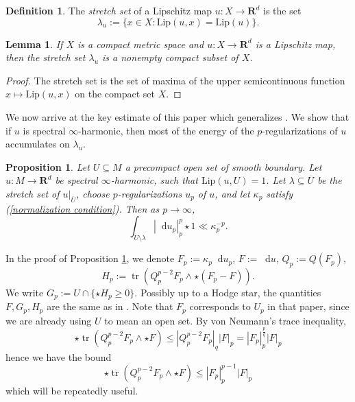 \documentclass[reqno,11pt]{amsart}
\newcommand{\RR}{\mathbf{R}}
\newcommand*\dif{\mathop{}\!\mathrm{d}}
\DeclareMathOperator{\tr}{tr}
\newcommand{\Lip}{\mathrm{Lip}}
\newcommand{\dfn}[1]{\emph{#1}\index{#1}}
\newtheorem{lemma}[theorem]{Lemma}
\newtheorem{proposition}[theorem]{Proposition}
\theoremstyle{definition}
\newtheorem{definition}[theorem]{Definition}
\numberwithin{equation}{section}
\begin{document}
\begin{definition}
The \dfn{stretch set} of a Lipschitz map $u: X \to \RR^d$ is the set 
$$\lambda_u := \{x \in X: \Lip(u, x) = \Lip(u)\}.$$
\end{definition}

\begin{lemma}\label{stretch set is compact}
If $X$ is a compact metric space and $u: X \to \RR^d$ is a Lipschitz map, then the stretch set $\lambda_u$ is a nonempty compact subset of $X$.
\end{lemma}
\begin{proof}
The stretch set is the set of maxima of the upper semicontinuous function $x \mapsto \Lip(u, x)$ on the compact set $X$.
\end{proof}

We now arrive at the key estimate of this paper which generalizes \cite[Proposition 6.5]{daskalopoulos2022transverse}.
We show that if $u$ is spectral $\infty$-harmonic, then most of the energy of the $p$-regularizations of $u$ accumulates on $\lambda_u$.

\begin{proposition}\label{main estimate}
Let $U \subseteq M$ a precompact open set of smooth boundary.
Let $u: M \to \RR^d$ be spectral $\infty$-harmonic, such that $\Lip(u, U) = 1$.
Let $\lambda \subseteq \overline U$ be the stretch set of $u|_{\overline U}$, choose $p$-regularizations $u_p$ of $u$, and let $\kappa_p$ satisfy (\ref{normalization condition}).
Then as $p \to \infty$,
\begin{equation}\label{decay}
\int_{U \setminus \lambda} |\dif u_p|_{p}^p \star 1 \ll \kappa_p^{-p}.
\end{equation}
\end{proposition}

In the proof of Proposition \ref{main estimate}, we denote $F_p := \kappa_p \dif u_p$, $F := \dif u$, $Q_p := Q(F_p)$,
$$H_p := \tr(Q_p^{p - 2} F_p \wedge \star(F_p - F)).$$
We write $G_p := U \cap \{\star H_p \geq 0\}$.
Possibly up to a Hodge star, the quantities $F, G_p, H_p$ are the same as in \cite[\S7]{daskalopoulos2022analytic}.
Note that $F_p$ corresponds to $U_p$ in that paper, since we are already using $U$ to mean an open set.
By von Neumann's trace inequality,
$$\star \tr(Q_p^{p - 2} F_p \wedge \star F) \leq |Q_p^{p - 2} F_p|_q |F|_p = |F_p|_p^{\frac{p}{q}} |F|_p$$
hence we have the bound
\begin{equation}\label{bound on half of Hp}
  \star \tr(Q_p^{p - 2} F_p \wedge \star F) \leq |F_p|_p^{p - 1} |F|_p
\end{equation}
which will be repeatedly useful.
\end{document}
